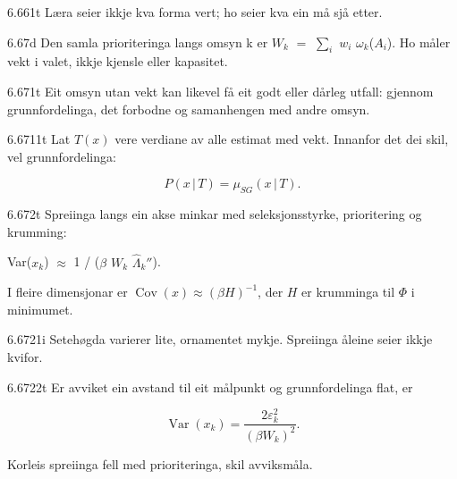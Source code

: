 \begin{formproposition}{6.661}{t}
Læra seier ikkje kva forma vert; ho seier kva ein må sjå etter.
\end{formproposition}

\begin{formproposition}{6.67}{d}
Den samla prioriteringa langs omsyn k er \(W_{k}\) \(=\) \(∑_{i}\) \(w_{i}\) \(ω_{k}\)(\(A_{i}\)). Ho måler vekt i valet, ikkje kjensle eller kapasitet.
\end{formproposition}

\begin{formproposition}{6.671}{t}
Eit omsyn utan vekt kan likevel få eit godt eller dårleg utfall: gjennom grunnfordelinga, det forbodne og samanhengen med andre omsyn.
\end{formproposition}

\begin{formproposition}{6.6711}{t}
Lat \(T(x)\) vere verdiane av alle estimat med vekt. Innanfor det dei skil, vel grunnfordelinga:

\[
P(x\,|\,T)=\mu_{SG}(x\,|\,T).
\]
\end{formproposition}

\begin{formproposition}{6.672}{t}
Spreiinga langs ein akse minkar med seleksjonsstyrke, prioritering og krumming:

Var(\(x_{k}\)) \(≈\) 1 / (\(β\) \(W_{k}\) \(\hat{Λ}_{k}\)\(″\)).

I fleire dimensjonar er \(\operatorname{Cov}(x)\approx(\beta H)^{-1}\), der \(H\) er krumminga til \(\Phi\) i minimumet.
\end{formproposition}

\begin{formproposition}{6.6721}{i}
Setehøgda varierer lite, ornamentet mykje. Spreiinga åleine seier ikkje kvifor.
\end{formproposition}

\begin{formproposition}{6.6722}{t}
Er avviket ein avstand til eit målpunkt og grunnfordelinga flat, er

\[
\operatorname{Var}(x_k)=\frac{2\varepsilon_k^2}{(\beta W_k)^2}.
\]

Korleis spreiinga fell med prioriteringa, skil avviksmåla.
\end{formproposition}

